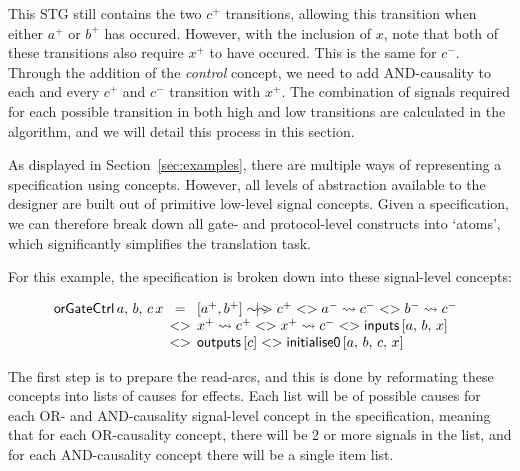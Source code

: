 \documentclass[british,conference,compsoc]{IEEEtran}
\begin{document}
This STG still contains the two $c^{+}$ transitions, allowing this transition 
when either $a^{+}$ or $b^{+}$ has occured. However, with the inclusion of $x$,
note that both of these transitions also require $x^{+}$ to have occured. This 
is the same for $c^{-}$. Through the addition of the \emph{control} concept, we 
need to add AND-causality to each and every $c^{+}$ and $c^{-}$ transition with 
$x^{+}$. The combination of signals required for each possible transition in 
both high and low transitions are calculated in the algorithm, and we will 
detail this process in this section.

As displayed in Section~\ref{sec:examples}, there are multiple ways of
representing a specification using concepts. However, all levels of
abstraction available to the designer are built out of primitive low-level
signal concepts. Given a specification, we can therefore
break down all gate- and protocol-level constructs into `atoms', which
significantly simplifies the translation task.

For this example, the specification is broken down into these signal-level 
concepts:

\[
\begin{array}{lcl}
\hspace{-2mm}\mathsf{orGateCtrl}\,a,\,b,\,c\,x&\hspace{-2mm}=
	&\hspace{-2mm}[a^{+}, b^{+}]
	\sim\hspace{-1.5mm}|\hspace{-1.5mm}\sim\hspace{-1.5mm}>c^{+} 
	<> a^{-}\rightsquigarrow c^{-} <> b^{-}\rightsquigarrow c^{-}\\
~&\hspace{-2mm}<>&\hspace{-2mm}x^{+}\rightsquigarrow c^{+} <>
	x^{+}\rightsquigarrow c^{-} <> \mathsf{inputs} \, [a,\,b,\,x] \\
~&\hspace{-2mm}<>&\hspace{-2mm}\mathsf{outputs}\,[c]
	<>\mathsf{initialise0}\,[a,\,b,\,c,\,x]
\end{array}
\]

\noindent The first step is to prepare the read-arcs, and this is done by
reformating these concepts into lists of causes for effects.
Each list will be of possible causes for each OR- and AND-causality signal-level
concept in the specification, meaning that for each OR-causality concept, 
there will be 2 or more signals in the list, and for each AND-causality 
concept there will be a single item list. 
\end{document}
